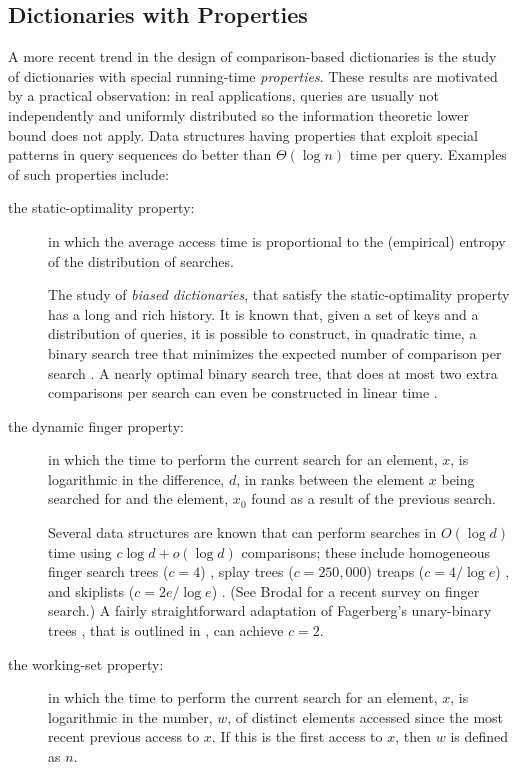 \documentclass{patmorin}
\begin{document}
\subsection{Dictionaries with Properties}

A more recent trend in the design of comparison-based dictionaries is the
study of dictionaries with special running-time \emph{properties}.  These
results are motivated by a practical observation: in real applications,
queries are usually not independently and uniformly distributed so the
information theoretic lower bound does not apply.  Data structures having
properties that exploit special patterns in query sequences do better than
$\Theta(\log n)$ time per query.  Examples of such properties include:
\begin{description}
\item[the static-optimality property:] in which the average access time is
    proportional to the (empirical) entropy of the distribution of
    searches.  

    The study of \emph{biased dictionaries}, that satisfy the
    static-optimality property has a long and rich history.  It is
    known that, given a set of keys and a distribution of queries,
    it is possible to construct, in quadratic time, a binary search
    tree that minimizes the expected number of comparison per search
    \cite{knuth}.  A nearly optimal binary search tree, that does at
    most two extra comparisons per search can even be constructed in
    linear time \cite{mehlhorn}.

\item[the dynamic finger property:] in which the time to perform the
    current search for an element, $x$, is logarithmic in the difference,
    $d$, in ranks between the element $x$ being searched for and the
    element, $x_0$ found as a result of the previous search.

    Several data structures are known that can perform searches in
    $O(\log d)$ time using $c\log d+o(\log d)$ comparisons; these
    include homogeneous finger search trees ($c=4$) \cite{tarjan:xxx},
    splay trees ($c=250,000$) \cite{cole} treaps ($c=4/\log e$)
    \cite{sksk}, and skiplists  ($c=2e/\log e$) \cite{sksk}.  (See Brodal
    \cite{brodal:finger} for a recent survey on finger search.)  A fairly
    straightforward adaptation of Fagerberg's unary-binary trees \cite{S},
    that is outlined in , can achieve $c=2$.

\item[the working-set property:] in which the time to perform the current
    search for an element, $x$, is logarithmic in the number, $w$, of
    distinct elements accessed since the most recent previous access to
    $x$.  If this is the first access to $x$, then $w$ is defined as $n$.


\end{description}
\end{document}
